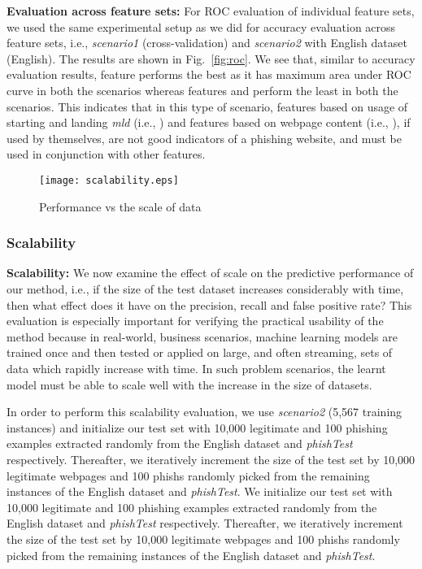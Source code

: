 \documentclass[10pt,conference,compsocconf,letterpaper]{IEEEtran}
\begin{document}
\iffeateval
\textbf{Evaluation across feature sets:} For ROC evaluation of individual feature sets, we used the same experimental setup as we did for accuracy evaluation across feature sets, i.e., \textit{scenario1} (cross-validation) and \textit{scenario2} with English dataset (English). 
The results are shown in Fig.~\ref{fig:roc}. We see that, similar to accuracy evaluation results, feature  performs the best as it has maximum area under ROC curve in both the scenarios whereas features  and  perform the least in both the scenarios. This indicates that in this type of scenario, features based on usage of starting and landing \textit{mld} (i.e., ) and features based on webpage content (i.e., ), if used by themselves, are not good indicators of a phishing website, and must be used in conjunction with other features.
\fi

\begin{figure}[th]
                \centering
                \texttt{[image: scalability.eps]}
                \caption{Performance vs the scale of data}
                \label{fig:scalability-eval}
\end{figure} 


\iffeateval
\subsubsection{Scalability}
\else
\noindent\textbf{Scalability:}
\fi
We now examine the effect of scale on the predictive performance of our method, i.e., if the size of the test dataset increases considerably with time, then what effect does it have on the precision, recall and false positive rate?
\iffeateval
This evaluation is especially important for verifying the practical usability of the method because in real-world, business scenarios,  machine learning models are trained once and then tested or applied on large, and often streaming, sets of data which rapidly increase with time. In such problem scenarios, the learnt model must be able to scale well with the increase in the size of datasets.

In order to perform this scalability evaluation, we use \textit{scenario2} (5,567 training instances) and initialize our test set with 10,000 legitimate and 100 phishing examples extracted randomly from the English dataset and \textit{phishTest} respectively. Thereafter, we iteratively increment the size of the test set by 10,000 legitimate webpages and 100 phishs randomly picked from the remaining instances of the English dataset and \textit{phishTest}.
\else
We initialize our test set with 10,000 legitimate and 100 phishing examples extracted randomly from the English dataset and \textit{phishTest} respectively. Thereafter, we iteratively increment the size of the test set by 10,000 legitimate webpages and 100 phishs randomly picked from the remaining instances of the English dataset and \textit{phishTest}.
\fi
\end{document}
